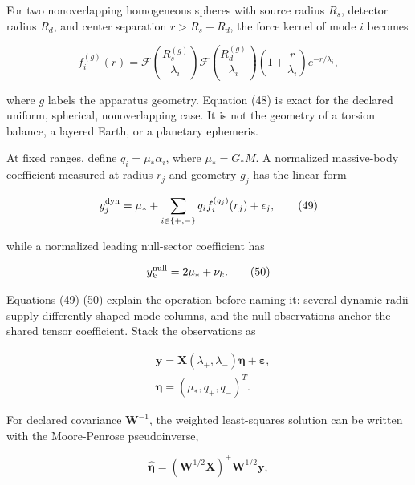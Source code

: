 \documentclass[
  american,
  11pt,
  letterpaper,
]{article}
\begin{document}
For two nonoverlapping homogeneous spheres with source radius \(R_s\), detector radius \(R_d\), and center separation \(r>R_s+R_d\), the force kernel of mode \(i\) becomes

\begin{equation}
f_i^{(g)}(r)
=
\mathcal F\!\left(\frac{R_s^{(g)}}{\lambda_i}\right)
\mathcal F\!\left(\frac{R_d^{(g)}}{\lambda_i}\right)
\left(1+\frac{r}{\lambda_i}\right)e^{-r/\lambda_i},
\tag{48}
\end{equation}

where \(g\) labels the apparatus geometry. Equation (48) is exact for the declared uniform, spherical, nonoverlapping case. It is not the geometry of a torsion balance, a layered Earth, or a planetary ephemeris.

At fixed ranges, define \(q_i=\mu_*\alpha_i\), where \(\mu_*=G_*M\). A normalized massive-body coefficient measured at radius \(r_j\) and geometry \(g_j\) has the linear form

\begin{equation}
y_j^{\rm dyn}
=\mu_*+\sum_{i\in\{+,-\}}q_i f_i^{(g_j)}(r_j)
+\epsilon_j ,
\tag{49}
\end{equation}

while a normalized leading null-sector coefficient has

\begin{equation}
y_k^{\rm null}=2\mu_*+\nu_k .
\tag{50}
\end{equation}

Equations (49)-(50) explain the operation before naming it: several dynamic radii supply differently shaped mode columns, and the null observations anchor the shared tensor coefficient. Stack the observations as

\begin{equation}
\begin{aligned}
& \mathbf y
=\mathbf X(\lambda_+,\lambda_-)\boldsymbol\eta+\boldsymbol\varepsilon, \\
& \boldsymbol\eta=(\mu_*,q_+,q_-)^T .
\end{aligned}
\tag{51}
\end{equation}

For declared covariance \(\mathbf W^{-1}\), the weighted least-squares solution can be written with the Moore-Penrose pseudoinverse,

\begin{equation}
\widehat{\boldsymbol\eta}
=
\left(\mathbf W^{1/2}\mathbf X\right)^+
\mathbf W^{1/2}\mathbf y ,
\tag{52}
\end{equation}
\end{document}
